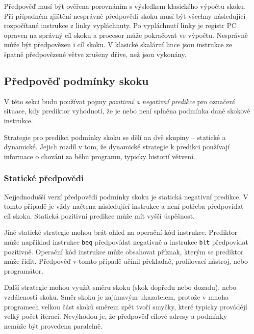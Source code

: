 Předpověď musí být ověřena porovnáním s výsledkem klasického výpočtu skoku.
Při případném zjištění nesprávné předpovědi skoku musí být všechny následující rozpočítané instrukce z linky vypláchnuty.
Po vypláchnutí linky je registr PC opraven na správný cíl skoku a procesor může pokračovat ve výpočtu.
Nesprávně může být předpovězen i cíl skoku.
V klasické skalární lince jsou instrukce ze špatně předpovězené větve zrušeny dříve, než jsou vykonány.


\subsection{Předpověď podmínky skoku}

V této sekci budu používat pojmy \emph{pozitivní a negativní predikce} pro označení situace, kdy prediktor vyhodnotí, že je nebo není splněna podmínka dané skokové instrukce.

Strategie pro predikci podmínky skoku se dělí na dvě skupiny -- statické a dynamické.
Jejich rozdíl v tom, že dynamické strategie k predikci používají informace o chování za běhu programu, typicky historií větvení.
\cite{branchStrategies}

\subsubsection{Statické předpovědi}

Nejjednodušší verzí předpovědi podmínky skoku je statická negativní predikce.
V tomto případě je vždy načtena následující instrukce a není potřeba předpovídat cíl skoku.
Statická pozitivní predikce může mít vyšší úspěšnost.

Jiné statické strategie mohou brát ohled na operační kód instrukce.
Prediktor může například instrukce \texttt{beq} předpovídat negativně a instrukce \texttt{blt} předpovídat pozitivně.
Operační kód instrukce může obsahovat příznak, kterým se prediktor může řídit.
Předpověď v tomto případě učinil překladač, profilovací nástroj, nebo programátor. \cite{branchStrategies}

Další strategie mohou využít směru skoku (skok dopředu nebo dozadu), nebo vzdálenosti skoku.
Směr skoku je zajímavým ukazatelem, protože v mnoha programech velkou část skoků směrem zpět tvoří smyčky, které typicky provádějí velký počet iterací.
Nevýhodou je, že předpověď cílové adresy a podmínky nemůže být provedena paralelně.

